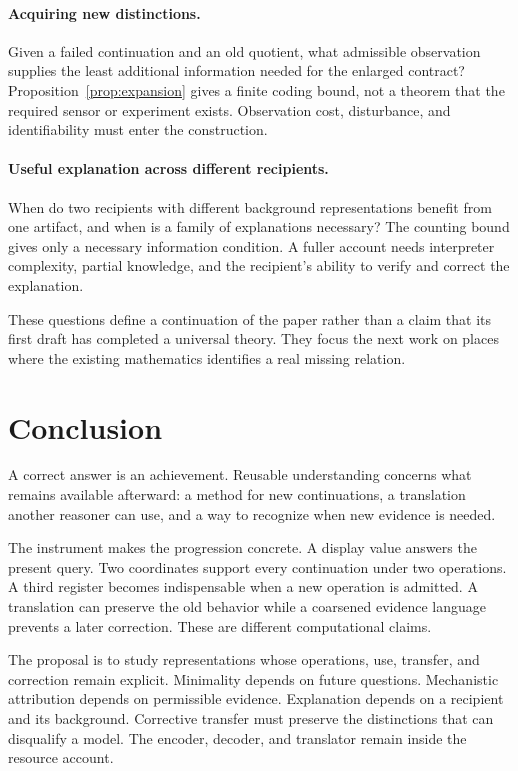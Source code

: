 \documentclass[11pt,letterpaper]{article}
\theoremstyle{plain}
\theoremstyle{definition}
\begin{document}
\paragraph{Acquiring new distinctions.}
Given a failed continuation and an old quotient, what admissible observation supplies the least additional information needed for the enlarged contract? Proposition~\ref{prop:expansion} gives a finite coding bound, not a theorem that the required sensor or experiment exists. Observation cost, disturbance, and identifiability must enter the construction.

\paragraph{Useful explanation across different recipients.}
When do two recipients with different background representations benefit from one artifact, and when is a family of explanations necessary? The counting bound gives only a necessary information condition. A fuller account needs interpreter complexity, partial knowledge, and the recipient's ability to verify and correct the explanation.

These questions define a continuation of the paper rather than a claim that its first draft has completed a universal theory. They focus the next work on places where the existing mathematics identifies a real missing relation.

\section{Conclusion}\label{sec:conclusion}
A correct answer is an achievement. Reusable understanding concerns what remains available afterward: a method for new continuations, a translation another reasoner can use, and a way to recognize when new evidence is needed.

The instrument makes the progression concrete. A display value answers the present query. Two coordinates support every continuation under two operations. A third register becomes indispensable when a new operation is admitted. A translation can preserve the old behavior while a coarsened evidence language prevents a later correction. These are different computational claims.

The proposal is to study representations whose operations, use, transfer, and correction remain explicit. Minimality depends on future questions. Mechanistic attribution depends on permissible evidence. Explanation depends on a recipient and its background. Corrective transfer must preserve the distinctions that can disqualify a model. The encoder, decoder, and translator remain inside the resource account.
\end{document}
